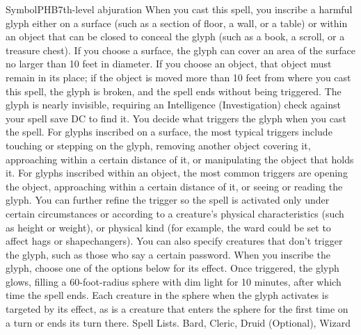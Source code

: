 \begin{spell}{Symbol}{PHB}{7th-level abjuration}
{
}
When you cast this spell, you inscribe a harmful glyph either on a surface (such as a section of floor, a wall, or a table) or within an object that can be closed to conceal the glyph (such as a book, a scroll, or a treasure chest). If you choose a surface, the glyph can cover an area of the surface no larger than 10 feet in diameter. If you choose an object, that object must remain in its place; if the object is moved more than 10 feet from where you cast this spell, the glyph is broken, and the spell ends without being triggered.
The glyph is nearly invisible, requiring an Intelligence (Investigation) check against your spell save DC to find it.
You decide what triggers the glyph when you cast the spell. For glyphs inscribed on a surface, the most typical triggers include touching or stepping on the glyph, removing another object covering it, approaching within a certain distance of it, or manipulating the object that holds it. For glyphs inscribed within an object, the most common triggers are opening the object, approaching within a certain distance of it, or seeing or reading the glyph.
You can further refine the trigger so the spell is activated only under certain circumstances or according to a creature's physical characteristics (such as height or weight), or physical kind (for example, the ward could be set to affect hags or shapechangers). You can also specify creatures that don't trigger the glyph, such as those who say a certain password.
When you inscribe the glyph, choose one of the options below for its effect. Once triggered, the glyph glows, filling a 60-foot-radius sphere with dim light for 10 minutes, after which time the spell ends. Each creature in the sphere when the glyph activates is targeted by its effect, as is a creature that enters the sphere for the first time on a turn or ends its turn there.
Spell Lists. Bard, Cleric, Druid (Optional), Wizard
\end{spell}

